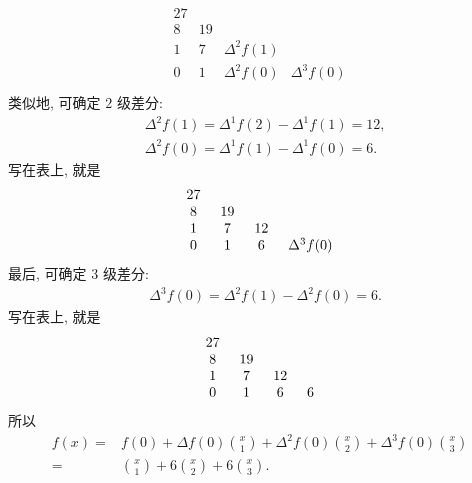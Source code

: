 \begin{example}
\begin{align*}
\begin{array}{cccc}
            27 & \  & \               & \               \\
            8  & 19 & \               & \               \\
            1  & 7  & \Delta^{2} f(1) & \               \\
            0  & 1  & \Delta^{2} f(0) & \Delta^{3} f(0) \\
        \end{array}
    \end{align*}
    类似地, 可确定 $2$ 级差分:
    \begin{align*}
         & \Delta^{2} f(1) = \Delta^{1} f(2) - \Delta^{1} f(1) = 12, \\
         & \Delta^{2} f(0) = \Delta^{1} f(1) - \Delta^{1} f(0) = 6.
    \end{align*}
    写在表上, 就是
    \begin{align*}
        \arraycolsep=0.25cm
        \begin{array}{cccc}
            27 & \  & \  & \               \\
            8  & 19 & \  & \               \\
            1  & 7  & 12 & \               \\
            0  & 1  & 6  & \Delta^{3} f(0) \\
        \end{array}
    \end{align*}
    最后, 可确定 $3$ 级差分:
    \begin{align*}
         & \Delta^{3} f(0) = \Delta^{2} f(1) - \Delta^{2} f(0) = 6.
    \end{align*}
    写在表上, 就是
    \begin{align*}
        \arraycolsep=0.25cm
        \begin{array}{cccc}
            27 & \  & \  & \ \\
            8  & 19 & \  & \ \\
            1  & 7  & 12 & \ \\
            0  & 1  & 6  & 6 \\
        \end{array}
    \end{align*}
    所以
    \begin{align*}
        f(x)
        = {} & f(0) + \Delta f(0) \binom{x}{1} + \Delta^2 f(0) \binom{x}{2} + \Delta^3 f(0) \binom{x}{3} \\
        = {} & \binom{x}{1} + 6 \binom{x}{2} + 6 \binom{x}{3}.
    \end{align*}

\end{example}
